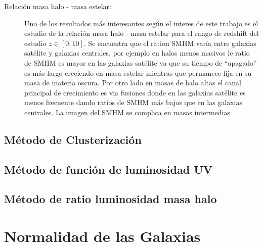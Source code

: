 \begin{description}
	\item[Relación masa halo - masa estelar:] Uno de los resultados más interesantes según el interes de este trabajo es el estudio de la relación masa halo - masa estelar para el rango de redshift del estudio $z\in [0,10]$. Se encuentra que el ration SMHM varía entre galaxias satélite y galaxias centrales, por ejemplo en halos menos masivos le ratio de SMHM es mayor en las galaxias satélite ya que su tiempo de ``apagado''  es más largo creciendo en masa estelar mientras que permanece fija en su masa de materia oscura. Por otro lado en masas de halo altas el canal principal de crecimiento es via fusiones donde en las galaxias satélite es menos frecuente dando ratios de SMHM más bajos que en las galaxias centrales. La imagen del SMHM se complica en masas intermedias 
	
	
\end{description}

\subsection{Método de Clusterización}

\subsection{Método de función de luminosidad UV}

\subsection{Método de ratio luminosidad masa halo}

\section{Normalidad de las Galaxias}

